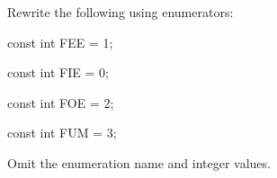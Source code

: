 Rewrite the following using enumerators:



\begin{consolethree}[escapeinside=||]

const int FEE = 1;

const int FIE = 0;

const int FOE = 2;

const int FUM = 3;

\end{consolethree}



Omit the enumeration name and integer values.

